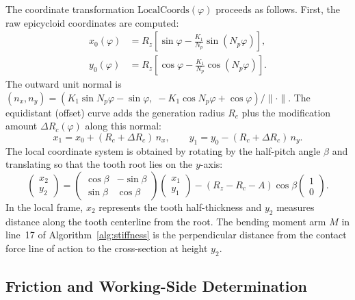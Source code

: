 \documentclass{article}
\begin{document}
The coordinate transformation $\text{LocalCoords}(\varphi)$ proceeds as follows. First, the raw epicycloid coordinates are computed:
\begin{equation}
\begin{aligned}
x_0(\varphi) &= R_z\!\left[\sin\varphi - \frac{K_1}{N_p}\sin(N_p\varphi)\right], \\
y_0(\varphi) &= R_z\!\left[\cos\varphi - \frac{K_1}{N_p}\cos(N_p\varphi)\right].
\end{aligned}
\label{eqn:raw_epicycloid}
\end{equation}
The outward unit normal is $(n_x, n_y) = (K_1\sin N_p\varphi - \sin\varphi,\; -K_1\cos N_p\varphi + \cos\varphi) / \|\cdot\|$. The equidistant (offset) curve adds the generation radius $R_c$ plus the modification amount $\Delta R_c(\varphi)$ along this normal:
\begin{equation}
x_1 = x_0 + (R_c + \Delta R_c)\, n_x, \qquad y_1 = y_0 - (R_c + \Delta R_c)\, n_y.
\end{equation}
The local coordinate system is obtained by rotating by the half-pitch angle $\beta$ and translating so that the tooth root lies on the $y$-axis:
\begin{equation}
\begin{pmatrix} x_2 \\ y_2 \end{pmatrix} =
\begin{pmatrix} \cos\beta & -\sin\beta \\ \sin\beta & \cos\beta \end{pmatrix}
\begin{pmatrix} x_1 \\ y_1 \end{pmatrix}
- (R_z - R_c - A)\cos\beta
\begin{pmatrix} 1 \\ 0 \end{pmatrix}.
\label{eqn:coord_transform}
\end{equation}
In the local frame, $x_2$ represents the tooth half-thickness and $y_2$ measures distance along the tooth centerline from the root. The bending moment arm $M$ in line~17 of Algorithm~\ref{alg:stiffness} is the perpendicular distance from the contact force line of action to the cross-section at height $y_2$.

\subsection{Friction and Working-Side Determination}
\label{sec:alg_friction}
\end{document}
